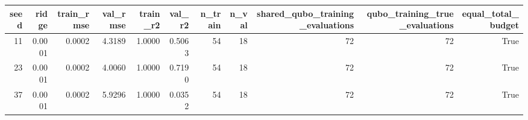 \begin{tabular}{rrrrrrrrrrr}
\toprule
seed & ridge & train\_rmse & val\_rmse & train\_r2 & val\_r2 & n\_train & n\_val & shared\_qubo\_training\_evaluations & qubo\_training\_true\_evaluations & equal\_total\_budget \\
\midrule
11 & 0.0001 & 0.0002 & 4.3189 & 1.0000 & 0.5063 & 54 & 18 & 72 & 72 & True \\
23 & 0.0001 & 0.0002 & 4.0060 & 1.0000 & 0.7190 & 54 & 18 & 72 & 72 & True \\
37 & 0.0001 & 0.0002 & 5.9296 & 1.0000 & 0.0352 & 54 & 18 & 72 & 72 & True \\
\bottomrule
\end{tabular}
